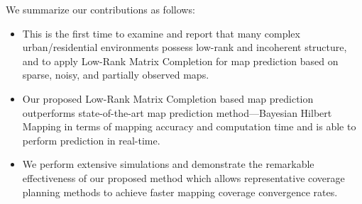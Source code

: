 

We summarize our contributions as follows:
\begin{itemize}
    \item 
    This is the first time to examine and report that many complex urban/residential environments possess low-rank and incoherent structure, and to apply Low-Rank Matrix Completion for map prediction based on sparse, noisy, and partially observed maps.
    \item
    Our proposed Low-Rank Matrix Completion based map prediction outperforms state-of-the-art map prediction method---Bayesian Hilbert Mapping in terms of mapping accuracy and computation time and is able to perform prediction in real-time.
    \item
    We perform extensive simulations and demonstrate the remarkable effectiveness of our proposed method  which allows representative coverage planning methods to achieve faster mapping coverage convergence rates.  %
\end{itemize}
